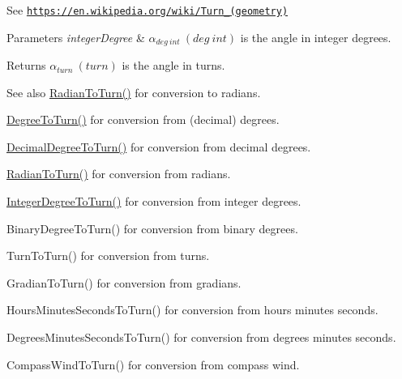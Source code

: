 See \href{https://en.wikipedia.org/wiki/Turn_(geometry)}{\tt https\+://en.\+wikipedia.\+org/wiki/\+Turn\+\_\+(geometry)} 
\begin{DoxyParams}{Parameters}
{\em integer\+Degree} & $\alpha_{deg\ int}\ (deg\ int)$ is the angle in integer degrees. \\
\hline
\end{DoxyParams}
\begin{DoxyReturn}{Returns}
$\alpha_{turn}\ (turn)$ is the angle in turns. 
\end{DoxyReturn}
\begin{DoxySeeAlso}{See also}
\mbox{\hyperlink{group___e_g_x_math-_angle_conversions-_radian_ga8492d6d2f6467c619b65e5fb75a9ae04}{Radian\+To\+Turn()}} for conversion to radians. 

\mbox{\hyperlink{group___e_g_x_math-_angle_conversions-_degree_gafb4ce930493a7d6202ede3ee1630ef5d}{Degree\+To\+Turn()}} for conversion from (decimal) degrees. 

\mbox{\hyperlink{group___e_g_x_math-_angle_conversions-_decimal_degree_ga396a13c10acdef5026c12f3217b142c1}{Decimal\+Degree\+To\+Turn()}} for conversion from decimal degrees. 

\mbox{\hyperlink{group___e_g_x_math-_angle_conversions-_radian_ga8492d6d2f6467c619b65e5fb75a9ae04}{Radian\+To\+Turn()}} for conversion from radians. 

\mbox{\hyperlink{group___e_g_x_math-_angle_conversions-_integer_degree_ga06ddbdada5a3978105c855d4aae735ae}{Integer\+Degree\+To\+Turn()}} for conversion from integer degrees. 

Binary\+Degree\+To\+Turn() for conversion from binary degrees. 

Turn\+To\+Turn() for conversion from turns. 

Gradian\+To\+Turn() for conversion from gradians. 

Hours\+Minutes\+Seconds\+To\+Turn() for conversion from hours minutes seconds. 

Degrees\+Minutes\+Seconds\+To\+Turn() for conversion from degrees minutes seconds. 

Compass\+Wind\+To\+Turn() for conversion from compass wind. 
\end{DoxySeeAlso}
